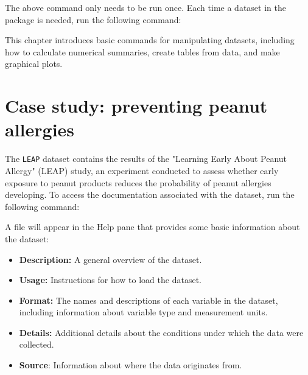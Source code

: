The above command only needs to be run once. Each time a dataset in the package is needed, run the following command: 

\begin{knitrout}
\color{fgcolor}\begin{kframe}
\begin{alltt}
 
\end{alltt}
\end{kframe}
\end{knitrout}


This chapter introduces basic commands for manipulating datasets, including how to calculate numerical summaries, create tables from data, and make graphical plots. 

\section{Case study: preventing peanut allergies}

The \texttt{LEAP} dataset contains the results of the "Learning Early About Peanut Allergy" (LEAP) study, an experiment conducted to assess whether early exposure to peanut products reduces the probability of peanut allergies developing. To access the documentation associated with the dataset, run the following command: 

\begin{knitrout}
\color{fgcolor}\begin{kframe}
\begin{alltt}
\end{alltt}
\end{kframe}
\end{knitrout}

A file will appear in the Help pane that provides some basic information about the dataset:

\begin{itemize}
\item \textbf{Description:} A general overview of the dataset. 
\item \textbf{Usage:} Instructions for how to load the dataset. 
\item \textbf{Format:} The names and descriptions of each variable in the dataset, including information about variable type and measurement units.
\item \textbf{Details:} Additional details about the conditions under which the data were collected.
\item \textbf{Source}: Information about where the data originates from.
\end{itemize}

